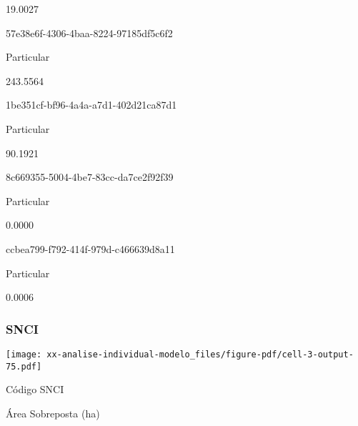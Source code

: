 \documentclass[
  11pt,
  a4paper,
  DIV=11,
  numbers=noendperiod]{scrartcl}
\begin{document}
\n      

19.0027

\n    

\n    

\n      

57e38e6f-4306-4baa-8224-97185df5c6f2

\n      

Particular

\n      

243.5564

\n    

\n    

\n      

1be351cf-bf96-4a4a-a7d1-402d21ca87d1

\n      

Particular

\n      

90.1921

\n    

\n    

\n      

8c669355-5004-4be7-83cc-da7ce2f92f39

\n      

Particular

\n      

0.0000

\n    

\n    

\n      

ccbea799-f792-414f-979d-c466639d8a11

\n      

Particular

\n      

0.0006

\n    

\n  

\n

\subsubsection{SNCI}\label{snci-3}

\texttt{[image: xx-analise-individual-modelo\_files/figure-pdf/cell-3-output-75.pdf]}

\n  

\n    

\n      

Código SNCI

\n      

Área Sobreposta (ha)
\end{document}

